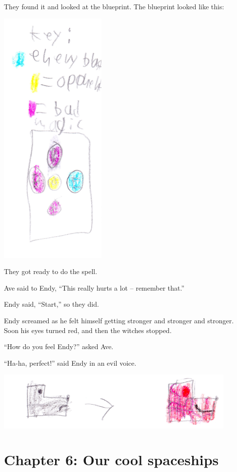 \documentclass[12pt,oneside]{krantz}
\begin{document}
They found it and looked at the blueprint. The blueprint looked like
this:

\includegraphics[width=2.08333in,height=\textheight]{img/key.jpg}

They got ready to do the spell.

Ave said to Endy, ``This really hurts a lot -- remember that.''

Endy said, ``Start,'' so they did.

Endy screamed as he felt himself getting stronger and stronger and
stronger. Soon his eyes turned red, and then the witches stopped.

``How do you feel Endy?'' asked Ave.

``Ha-ha, perfect!'' said Endy in an evil voice.

\includegraphics[width=4.6875in,height=\textheight]{img/endy.jpg}

\hypertarget{chapter-6-our-cool-spaceships}{%
\chapter*{Chapter 6: Our cool
spaceships}\label{chapter-6-our-cool-spaceships}}
\end{document}
